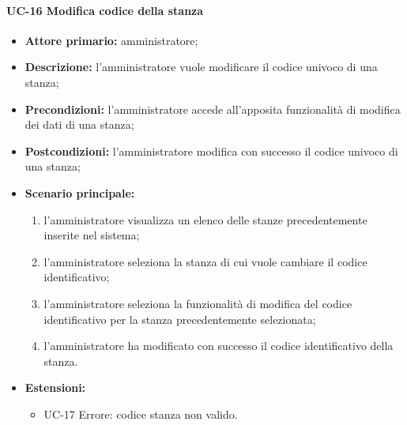\paragraph{UC-16 Modifica codice della stanza}
\begin{itemize}
	\item \textbf{Attore primario:} amministratore;
	\item\textbf{Descrizione:} l'amministratore vuole modificare il codice univoco di una stanza;
	\item\textbf{Precondizioni:} l'amministratore accede all'apposita funzionalità di modifica dei dati di una stanza;
	\item\textbf{Postcondizioni:} l'amministratore modifica con successo il codice univoco di una stanza;
	\item \textbf{Scenario principale:}
	      \begin{enumerate}
		      \item l'amministratore visualizza un elenco delle stanze precedentemente inserite nel sistema;
		      \item l'amministratore seleziona la stanza di cui vuole cambiare il codice identificativo;
		      \item l'amministratore seleziona la funzionalità di modifica del codice identificativo per la stanza precedentemente selezionata;
		      \item l'amministratore ha modificato con successo il codice identificativo della stanza.
	      \end{enumerate}
	\item \textbf{Estensioni:}
		\begin{itemize}
		      \item UC-17 Errore: codice stanza non valido.
	      \end{itemize}
\end{itemize}

